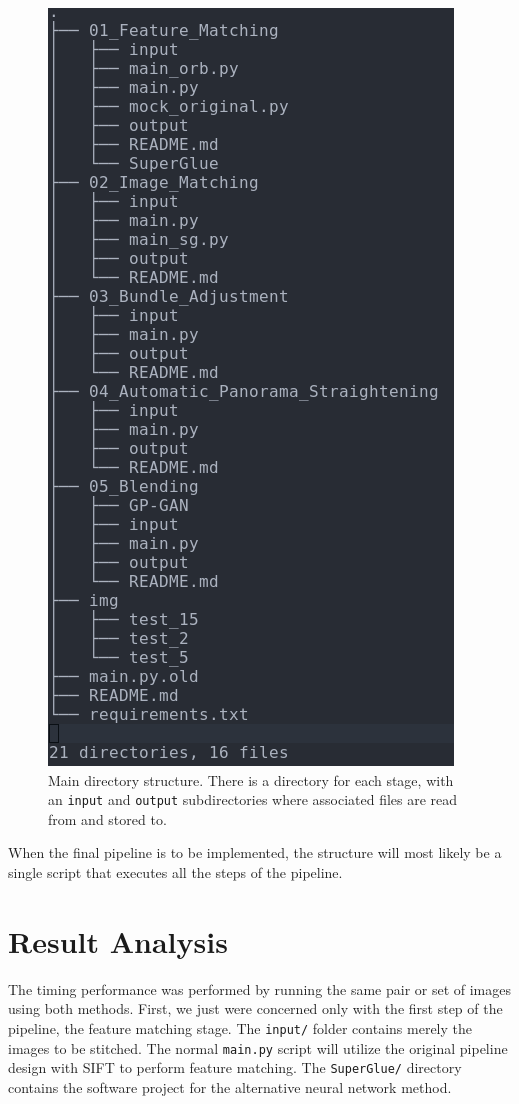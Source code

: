 \documentclass[12pt, a4paper]{article}
\begin{document}
\begin{figure}
	\label{fig:tree}
		\centering
		\includegraphics[scale=0.4]{dir.png}
		\caption{Main directory structure. There is a directory for each stage, with 
		an \texttt{input} and \texttt{output} subdirectories where associated files are 
		read from and stored to.}
\end{figure}

When the final pipeline is to be implemented, the structure will most likely be 
a single script that executes all the steps of the pipeline.
\section{Result Analysis}
\label{sec:Results}

The timing performance was performed by running the same pair or set of images using both
methods. First, we just were concerned only with the first step of the pipeline, the
feature matching stage. The \texttt{input/} folder contains merely the images to be stitched.
The normal \texttt{main.py} script will utilize the original pipeline design with SIFT to 
perform feature matching. The \texttt{SuperGlue/} directory contains the software project for
the alternative neural network method.
\end{document}
